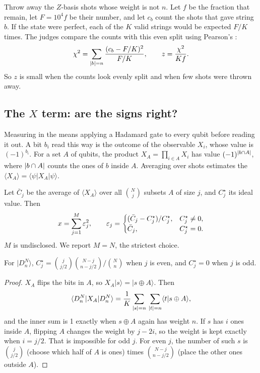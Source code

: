 \documentclass[11pt]{scrartcl}
\newcommand{\ket}[1]{\lvert #1\rangle}
\newcommand{\bra}[1]{\langle #1\rvert}
\newcommand{\D}[2]{D^{#1}_{#2}}
\begin{document}
Throw away the $Z$-basis shots whose weight is not $n$. Let $f$ be the fraction that remain, let
$F=10^4f$ be their number, and let $c_b$ count the shots that gave string $b$. If the state were
perfect, each of the $K$ valid strings would be expected $F/K$ times. The judges compare the
counts with this even split using Pearson's :
\[
  \chi^2=\sum_{\left\lvert b \right\rvert=n}\frac{(c_b-F/K)^2}{F/K},\qquad z=\frac{\chi^2}{Kf}.
\]
So $z$ is small when the counts look evenly split and when few shots were thrown away.

\subsection{The \texorpdfstring{$X$}{X} term: are the signs right?}\label{sec:xterm}

Measuring in the  means applying a Hadamard gate to every qubit before reading it
out. A bit $b_i$ read this way is the outcome of the observable $X_i$, whose value is $(-1)^{b_i}$.
For a set $A$ of qubits, the product $X_A=\prod_{i\in A}X_i$ has value $(-1)^{\left\lvert b\cap A \right\rvert}$, where
$\left\lvert b\cap A \right\rvert$ counts the ones of $b$ inside $A$. Averaging over shots estimates the
 $\langle X_A\rangle=\bra\psi X_A\ket\psi$.

Let $\bar C_j$ be the average of $\langle X_A\rangle$ over all $\binom Nj$ subsets $A$ of size $j$,
and $C^\star_j$ its ideal value. Then
\[
  x=\sum_{j=1}^{M}\varepsilon_j^2,\qquad
  \varepsilon_j=\begin{cases}(\bar C_j-C^\star_j)/C^\star_j,&C^\star_j\ne0,\\ \bar C_j,&C^\star_j=0.\end{cases}
\]
$M$ is undisclosed. We report $M=N$, the strictest choice.

\begin{proposition}
  For $\ket{\D Nn}$, $C^\star_j=\binom{j}{j/2}\binom{N-j}{n-j/2}\Big/\binom Nn$ when $j$ is even, and
  $C^\star_j=0$ when $j$ is odd.
\end{proposition}
\begin{proof}
  $X_A$ flips the bits in $A$, so $X_A\ket s=\ket{s\oplus A}$. Then
  \[
    \bra{\D Nn}X_A\ket{\D Nn}=\frac1K\sum_{\abs s=n}\,\sum_{\abs t=n}\langle t\vert s\oplus A\rangle,
  \]
  and the inner sum is 1 exactly when $s\oplus A$ again has weight $n$. If $s$ has $i$ ones inside
  $A$, flipping $A$ changes the weight by $j-2i$, so the weight is kept exactly when $i=j/2$. That is
  impossible for odd $j$. For even $j$, the number of such $s$ is $\binom{j}{j/2}$ (choose which
  half of $A$ is ones) times $\binom{N-j}{n-j/2}$ (place the other ones outside $A$).
\end{proof}
\end{document}
